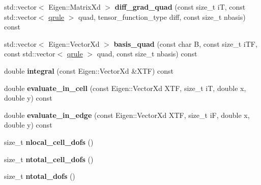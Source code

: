 \begin{DoxyCompactItemize}
std\+::vector$<$ Eigen\+::\+Matrix\+Xd $>$ {\bfseries diff\+\_\+grad\+\_\+quad} (const size\+\_\+t iT, const std\+::vector$<$ \hyperlink{structMeshFramework2D_1_1HybridCore_1_1qrule}{qrule} $>$ quad, tensor\+\_\+function\+\_\+type diff, const size\+\_\+t nbasis) const
\item 
\mbox{\label{classMeshFramework2D_1_1HybridCore_a70ecaec3f38864d84587f02c9683f248}} 
std\+::vector$<$ Eigen\+::\+Vector\+Xd $>$ {\bfseries basis\+\_\+quad} (const char B, const size\+\_\+t i\+TF, const std\+::vector$<$ \hyperlink{structMeshFramework2D_1_1HybridCore_1_1qrule}{qrule} $>$ quad, const size\+\_\+t nbasis) const
\item 
\mbox{\label{classMeshFramework2D_1_1HybridCore_a3ad3b9df433fbf84e4188e2ecffa4291}} 
double {\bfseries integral} (const Eigen\+::\+Vector\+Xd \&X\+TF) const
\item 
\mbox{\label{classMeshFramework2D_1_1HybridCore_abb83cd5d8b68b40d1d4c40cc96f1750b}} 
double {\bfseries evaluate\+\_\+in\+\_\+cell} (const Eigen\+::\+Vector\+Xd X\+TF, size\+\_\+t iT, double x, double y) const
\item 
\mbox{\label{classMeshFramework2D_1_1HybridCore_a58908d01c15d3ee8e45c71d1b12f22fe}} 
double {\bfseries evaluate\+\_\+in\+\_\+edge} (const Eigen\+::\+Vector\+Xd X\+TF, size\+\_\+t iF, double x, double y) const
\item 
\mbox{\label{classMeshFramework2D_1_1HybridCore_aff52b273cb899d37f099ac95c4ebdcfb}} 
size\+\_\+t {\bfseries nlocal\+\_\+cell\+\_\+dofs} ()
\item 
\mbox{\label{classMeshFramework2D_1_1HybridCore_a4c43389b8464bbca85d1f42e02270306}} 
size\+\_\+t {\bfseries ntotal\+\_\+cell\+\_\+dofs} ()
\item 
\mbox{\label{classMeshFramework2D_1_1HybridCore_a6ac5e2d17f0ba51d14ce68c3ba88782c}} 
size\+\_\+t {\bfseries ntotal\+\_\+dofs} ()
\item 
\mbox{\label{classMeshFramework2D_1_1HybridCore_ad4f8264739015f45de15d7857271f6d1}} 

\end{DoxyCompactItemize}
